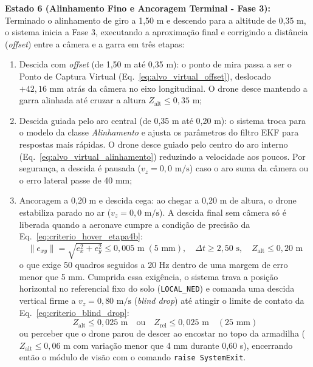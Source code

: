 \textbf{Estado 6 (Alinhamento Fino e Ancoragem Terminal - Fase 3):} Terminado o alinhamento de giro a 1,50 m e descendo para a altitude de 0,35 m, o sistema inicia a Fase 3, executando a aproximação final e corrigindo a distância (\textit{offset}) entre a câmera e a garra em três etapas:
\begin{enumerate}
	\item Descida com \textit{offset} (de 1,50 m até 0,35 m): o ponto de mira passa a ser o Ponto de Captura Virtual (Eq.~\ref{eq:alvo_virtual_offset}), deslocado $+42{,}16\text{ mm}$ atrás da câmera no eixo longitudinal. O drone desce mantendo a garra alinhada até cruzar a altura $Z_{\text{alt}} \le 0{,}35\text{ m}$;
	\item Descida guiada pelo aro central (de 0,35 m até 0,20 m): o sistema troca para o modelo da classe \textit{Alinhamento} e ajusta os parâmetros do filtro EKF para respostas mais rápidas. O drone desce guiado pelo centro do aro interno (Eq.~\ref{eq:alvo_virtual_alinhamento}) reduzindo a velocidade aos poucos. Por segurança, a descida é pausada ($v_z = 0{,}0\text{ m/s}$) caso o aro suma da câmera ou o erro lateral passe de 40 mm;
	\item Ancoragem a 0,20 m e descida cega: ao chegar a 0,20 m de altura, o drone estabiliza parado no ar ($v_z = 0{,}0\text{ m/s}$). A descida final sem câmera só é liberada quando a aeronave cumpre a condição de precisão da Eq.~\ref{eq:criterio_hover_etapa4b}:
	\begin{equation}
		\|e_{xy}\| = \sqrt{e_x^2 + e_y^2} \le 0{,}005\text{ m} \; (5\text{ mm}), \quad \Delta t \ge 2{,}50\text{ s}, \quad Z_{\text{alt}} \le 0{,}20\text{ m}
		\label{eq:criterio_hover_etapa4b}
	\end{equation}
	o que exige 50 quadros seguidos a 20 Hz dentro de uma margem de erro menor que 5 mm. Cumprida essa exigência, o sistema trava a posição horizontal no referencial fixo do solo (\texttt{LOCAL\_NED}) e comanda uma descida vertical firme a $v_z = 0{,}80\text{ m/s}$ (\textit{blind drop}) até atingir o limite de contato da Eq.~\ref{eq:criterio_blind_drop}:
	\begin{equation}
		Z_{\text{alt}} \le 0{,}025\text{ m} \quad \text{ou} \quad Z_{\text{rel}} \le 0{,}025\text{ m} \quad (25\text{ mm})
		\label{eq:criterio_blind_drop}
	\end{equation}
	ou perceber que o drone parou de descer ao encostar no topo da armadilha ($Z_{\text{alt}} \le 0{,}06\text{ m}$ com variação menor que 4 mm durante 0,60 s), encerrando então o módulo de visão com o comando \texttt{raise SystemExit}.
\end{enumerate}

